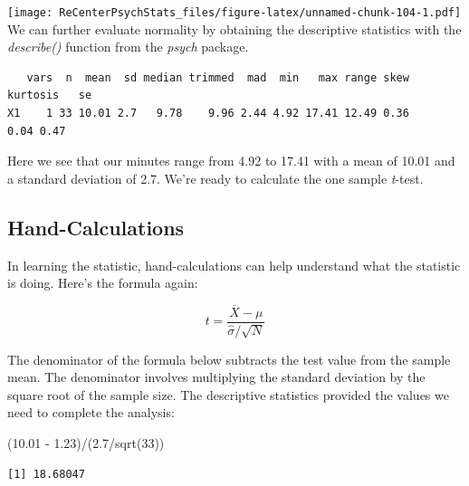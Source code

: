 \documentclass[
  11pt,
]{book}
\newenvironment{Shaded}{\begin{snugshade}}{\end{snugshade}}
\newcommand{\DecValTok}[1]{\textcolor[rgb]{0.00,0.00,0.81}{#1}}
\newcommand{\FloatTok}[1]{\textcolor[rgb]{0.00,0.00,0.81}{#1}}
\newcommand{\FunctionTok}[1]{\textcolor[rgb]{0.00,0.00,0.00}{#1}}
\newcommand{\NormalTok}[1]{#1}
\newcommand{\SpecialCharTok}[1]{\textcolor[rgb]{0.00,0.00,0.00}{#1}}
\begin{document}
\texttt{[image: ReCenterPsychStats\_files/figure-latex/unnamed-chunk-104-1.pdf]}
We can further evaluate normality by obtaining the descriptive statistics with the \emph{describe()} function from the \emph{psych} package.

\begin{Shaded}
\end{Shaded}

\begin{verbatim}
   vars  n  mean  sd median trimmed  mad  min   max range skew kurtosis   se
X1    1 33 10.01 2.7   9.78    9.96 2.44 4.92 17.41 12.49 0.36     0.04 0.47
\end{verbatim}

Here we see that our minutes range from 4.92 to 17.41 with a mean of 10.01 and a standard deviation of 2.7. We're ready to calculate the one sample \emph{t}-test.

\hypertarget{hand-calculations}{%
\subsection{Hand-Calculations}\label{hand-calculations}}

In learning the statistic, hand-calculations can help understand what the statistic is doing. Here's the formula again:

\[
t = \frac{\bar{X} - \mu}{\hat{\sigma}/\sqrt{N} }
\]

The denominator of the formula below subtracts the test value from the sample mean. The denominator involves multiplying the standard deviation by the square root of the sample size. The descriptive statistics provided the values we need to complete the analysis:

\begin{Shaded}
\begin{Highlighting}[]
\NormalTok{(}\FloatTok{10.01} \SpecialCharTok{{-}} \FloatTok{1.23}\NormalTok{)}\SpecialCharTok{/}\NormalTok{(}\FloatTok{2.7}\SpecialCharTok{/}\FunctionTok{sqrt}\NormalTok{(}\DecValTok{33}\NormalTok{))}
\end{Highlighting}
\end{Shaded}

\begin{verbatim}
[1] 18.68047
\end{verbatim}
\end{document}
